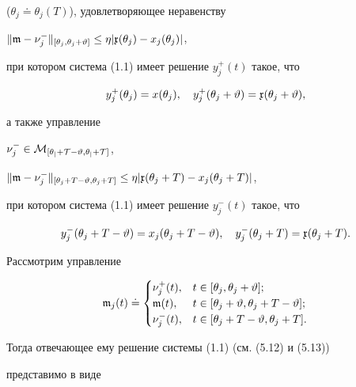 \begin{pf}
($\theta_j\doteq\theta_j(T)$), удовлетворяющее неравенству


$\|\frak m-\nu_j^-\|_{[\theta_j,\theta_j+\vartheta]}


\le\eta|\frak x(\theta_j)-x_j(\theta_j)|$,


при котором система (1.1) имеет решение $y_j^+(t)$ такое, что


\begin{equation}


y_j^+(\theta_j)=x(\theta_j),\quad


y_j^+(\theta_j+\vartheta)=\frak x(\theta_{j}+\vartheta),


\end{equation}


а также управление


$\nu_j^-\in\cal M_{[\theta_j+T-\vartheta,\theta_j+T]}$,


$\|\frak m-\nu_j^-\|_{[\theta_j+T-\vartheta,\theta_j+T]}


\le\eta|\frak x(\theta_j+T)-x_j(\theta_j+T)|$,


при котором система (1.1) имеет решение $y_j^-(t)$ такое, что


\begin{equation}


y_j^-(\theta_j+T-\vartheta)=x_j(\theta_j+T-\vartheta),\quad


y_j^-(\theta_j+T)=\frak x(\theta_j+T).


\end{equation}





Рассмотрим управление


$$


\frak m_j(t)\doteq\begin{cases}


\nu_j^+(t),& t\in[\theta_j,\theta_j+\vartheta]; \\


\frak m(t),& t\in[\theta_j+\vartheta,\theta_j+T-\vartheta]; \\


\nu_j^-(t),& t\in[\theta_j+T-\vartheta,\theta_j+T].


\end{cases}


$$


Тогда отвечающее ему решение системы (1.1) (см. (5.12) и (5.13))


представимо в виде


$$



\end{pf}
